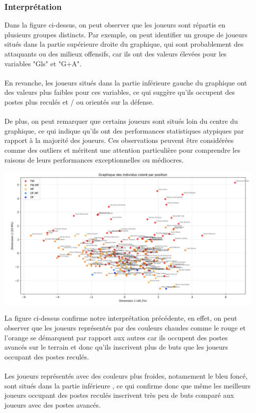\documentclass[12pt]{scrartcl}
\begin{document}
            \subsubsection{Interprétation}
                Dans la figure ci-dessus, on peut observer que les joueurs sont répartis en plusieurs groupes distincts. Par exemple, on peut identifier un groupe de joueurs situés dans la partie supérieure droite du graphique, qui sont probablement des attaquants ou des milieux offensifs, car ils ont des valeurs élevées pour les variables "Gls" et "G+A".\\\\
                En revanche, les joueurs situés dans la partie inférieure gauche du graphique ont des valeurs plus faibles pour ces variables, ce qui suggère qu'ils occupent des postes plus reculés et / ou orientés sur la défense.\\\\
                De plus, on peut remarquer que certains joueurs sont situés loin du centre du graphique, ce qui indique qu'ils ont des performances statistiques atypiques par rapport à la majorité des joueurs. Ces observations peuvent être considérées comme des outliers et méritent une attention particulière pour comprendre les raisons de leurs performances exceptionnelles ou médiocres.\\

                \begin{center}
                    \includegraphics[width=1\textwidth]{images/graphique_des_individus_positions.png}
                \end{center}

                La figure ci-dessus confirme notre interprétation précédente, en effet, on peut observer que les joueurs représentés par des couleurs chaudes comme le rouge et l'orange se démarquent par rapport aux autres car ils occupent des postes avancés sur le terrain et donc qu'ils inscrivent plus de buts que les joueurs occupant des postes reculés.\\\\
                Les joueurs représentés avec des couleurs plus froides, notamement le bleu foncé, sont situés dans la partie inférieure , ce qui confirme donc que même les meilleurs joueurs occupant des postes reculés inscrivent très peu de buts comparé aux joueurs avec des postes avancés.\\
\end{document}
